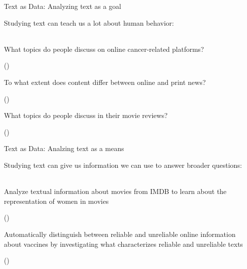 \documentclass[handout]{beamer}
\begin{document}
\begin{frame}{Text as Data: \small{Analyzing text as a goal}}
	
	Studying text can teach us a lot about human behavior: \\~
	
	What topics do people discuss on online cancer-related platforms? \\
	\begin{tiny}
		(\cite{sanders_different_2020}) \\
	\end{tiny}

	To what extent does content differ between online and print news? \\
	\begin{tiny}
	(\cite{burggraaff_through_2020}) \\
	\end{tiny}

	What topics do people discuss in their movie reviews? \\
	\begin{tiny}
	(\cite{schneider_what_2020}) \\
	\end{tiny}	

	
\end{frame}


\begin{frame}{Text as Data: \small{Analzing text as a means}}
	
	Studying text can give us information we can use to answer broader questions: \\~
	
	Analyze textual information about movies from IMDB to learn about the representation of women in movies \\
	\begin{tiny}
	(\cite{poma-murialdo_gender_2019}) \\
	\end{tiny}

	Automatically distinguish between reliable and unreliable online information about vaccines by investigating what characterizes reliable and unreliable texts \\
	\begin{tiny}
	(\cite{meppelink_reliable_2021}) \\
	\end{tiny}	
	

	
\end{frame}
\end{document}
